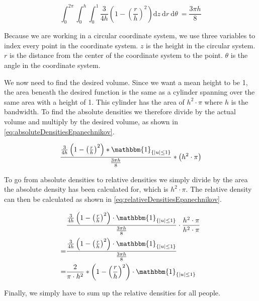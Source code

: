 \begin{equation}
\label{eq:volumeUnder3dEpanechnikov}
\int_0^{2 \pi} \int_0^h \int_0^1 \frac{3}{4 h} \left(1 - \left(\frac{r}{h}\right)^2\right) \mathrm{d}z\ \mathrm{d}r\ \mathrm{d}\theta\ = \frac{3 \pi h}{8}
\end{equation}

Because we are working in a circular coordinate system, we use three variables to index every point in the coordinate system. $z$ is the height in the circular system. $r$ is the distance from the center of the coordinate system to the point. $\theta$ is the angle in the coordinate system.

We now need to find the desired volume. Since we want a mean height to be 1, the area beneath the desired function is the same as a cylinder spanning over the same area with a height of 1. This cylinder has the area of $h^2 \cdot \pi$ where $h$ is the bandwidth. To find the absolute densities we therefore divide by the actual volume and multiply by the desired volume, as shown in \cref{eq:absoluteDensitiesEpanechnikov}.

\begin{equation}
\label{eq:absoluteDensitiesEpanechnikov}
\frac{\frac{3}{4 h} \left(1 - \left(\frac{r}{h}\right)^2\right) * \mathbbm{1}_{\{|u| \leq 1\}}}{\frac{3\pi h}{8}} * \left(h^2 \cdot \pi\right)
\end{equation}

To go from absolute densities to relative densities we simply divide by the area the absolute density has been calculated for, which is $h^2 \cdot \pi$. The relative density can then be calculated as shown in \cref{eq:relativeDensitiesEpanechnikov}.

\begin{equation}
\label{eq:relativeDensitiesEpanechnikov}
\begin{split}
&\frac{\frac{3}{4 h} \left(1 - \left(\frac{r}{h}\right)^2\right) \cdot \mathbbm{1}_{\{|u| \leq 1\}}}{\frac{3 \pi h}{8}} \cdot \frac{h^2 \cdot \pi}{h^2 \cdot \pi}\\
= &\frac{\frac{3}{4 h} \left(1 - \left(\frac{r}{h}\right)^2\right) \cdot  \mathbbm{1}_{\{|u| \leq 1\}}}{\frac{3 \pi h}{8}}\\
= &\frac{2}{\pi \cdot h^2} * \left(1-\left(\frac{r}{h}\right)^2\right) \cdot \mathbbm{1}_{\{|u| \leq 1\}}
\end{split}
\end{equation}

Finally, we simply have to sum up the relative densities for all people.


